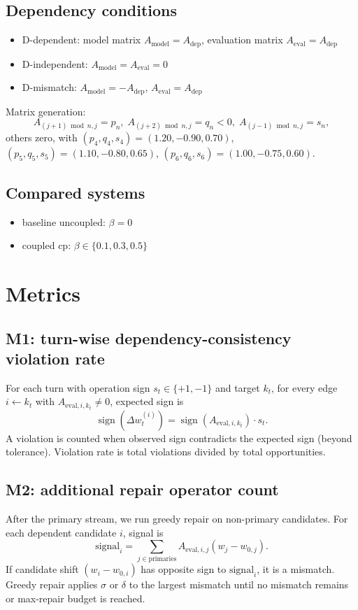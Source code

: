 \documentclass[11pt,a4paper]{article}
\begin{document}
\subsection{Dependency conditions}
\begin{itemize}
  \item D-dependent: model matrix \(A_{\text{model}}=A_{\text{dep}}\), evaluation matrix \(A_{\text{eval}}=A_{\text{dep}}\)
  \item D-independent: \(A_{\text{model}}=A_{\text{eval}}=0\)
  \item D-mismatch: \(A_{\text{model}}=-A_{\text{dep}}\), \(A_{\text{eval}}=A_{\text{dep}}\)
\end{itemize}

Matrix generation:
\[
A_{(j+1)\bmod n,j}=p_n,\;
A_{(j+2)\bmod n,j}=q_n<0,\;
A_{(j-1)\bmod n,j}=s_n,
\]
others zero, with
\((p_4,q_4,s_4)=(1.20,-0.90,0.70)\),
\((p_5,q_5,s_5)=(1.10,-0.80,0.65)\),
\((p_6,q_6,s_6)=(1.00,-0.75,0.60)\).

\subsection{Compared systems}
\begin{itemize}
  \item baseline uncoupled: \(\beta=0\)
  \item coupled cp: \(\beta\in\{0.1,0.3,0.5\}\)
\end{itemize}

\section{Metrics}
\subsection{M1: turn-wise dependency-consistency violation rate}
For each turn with operation sign \(s_t\in\{+1,-1\}\) and target \(k_t\), for every edge \(i\leftarrow k_t\) with \(A_{\text{eval},i,k_t}\neq 0\), expected sign is
\[
\operatorname{sign}(\Delta w_t^{(i)}) = \operatorname{sign}(A_{\text{eval},i,k_t})\cdot s_t.
\]
A violation is counted when observed sign contradicts the expected sign (beyond tolerance).
Violation rate is total violations divided by total opportunities.

\subsection{M2: additional repair operator count}
After the primary stream, we run greedy repair on non-primary candidates.
For each dependent candidate \(i\), signal is
\[
\text{signal}_i = \sum_{j\in\text{primaries}} A_{\text{eval},i,j}(w_j-w_{0,j}).
\]
If candidate shift \((w_i-w_{0,i})\) has opposite sign to \(\text{signal}_i\), it is a mismatch.
Greedy repair applies \(\sigma\) or \(\delta\) to the largest mismatch until no mismatch remains or max-repair budget is reached.
\end{document}
